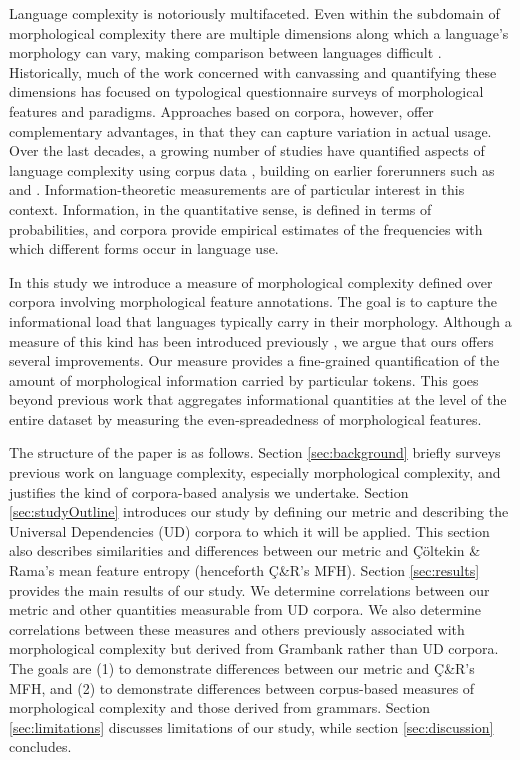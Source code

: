 \documentclass[USenglish]{article}
\begin{document}
Language complexity is notoriously multifaceted.
Even within the subdomain of morphological complexity there are multiple dimensions along which a language’s morphology can vary, making comparison between languages difficult \citep{miestamo_feasibility_2006}.
Historically, much of the work concerned with canvassing and quantifying these dimensions has focused on typological questionnaire surveys of morphological features and paradigms.
Approaches based on corpora, however, offer complementary advantages, in that they can capture variation in actual usage.
Over the last decades, a growing number of studies have quantified aspects of language complexity using corpus data \citep{moscoso_del_prado_martin_putting_2004, sagot_comparing_2013, bentz2016comparison, koplenig2023languages}, building on earlier forerunners such as \citet{greenberg_quantitative_1960} and \citet{juola1998measuring}.
Information-theoretic measurements are of particular interest in this context.
Information, in the quantitative sense, is defined in terms of probabilities, and corpora provide empirical estimates of the frequencies with which different forms occur in language use.

In this study we introduce a measure of morphological complexity defined over corpora involving morphological feature annotations.
The goal is to capture the informational load that languages typically carry in their morphology.
Although a measure of this kind has been introduced previously \citep{ccoltekin2023complexity}, we argue that ours offers several improvements.
Our measure provides a fine-grained quantification of the amount of morphological information carried by particular tokens.
This goes beyond previous work that aggregates informational quantities at the level of the entire dataset by measuring the even-spreadedness of morphological features.

The structure of the paper is as follows.
Section \ref{sec:background} briefly surveys previous work on language complexity, especially morphological complexity, and justifies the kind of corpora-based analysis we undertake.
Section \ref{sec:studyOutline} introduces our study by defining our metric and describing the Universal Dependencies (UD) corpora to which it will be applied.
This section also describes similarities and differences between our metric and Çöltekin \& Rama's mean feature entropy (henceforth Ç\&R's MFH).
Section \ref{sec:results} provides the main results of our study.
We determine correlations between our metric and other quantities measurable from UD corpora.
We also determine correlations between these measures and others previously associated with morphological complexity but derived from Grambank rather than UD corpora.
The goals are (1) to demonstrate differences between our metric and Ç\&R's MFH, and (2) to demonstrate differences between corpus-based measures of morphological complexity and those derived from grammars.
Section \ref{sec:limitations} discusses limitations of our study, while section \ref{sec:discussion} concludes.
\end{document}
